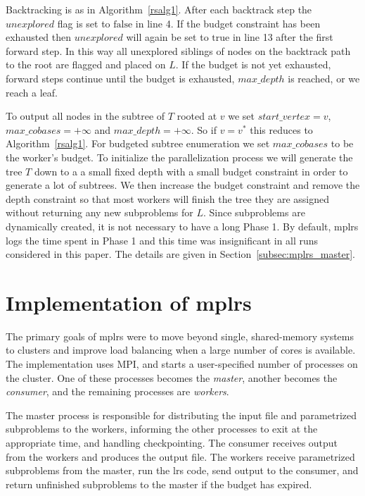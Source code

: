 \documentclass[a4paper,11pt]{article}   \usepackage{authblk} \usepackage[top=1.9cm,bottom=1.9cm,left=1.9cm,right=1.9cm]{geometry}
\newcommand{\progname}{\textsf}
\newcommand{\lrs}{\progname{lrs}\xspace}
\newcommand{\mplrs}{\progname{mplrs}\xspace}
\newcommand{\mymaxdepth}{\ensuremath{\mathit{max\_depth}}\xspace}
\newcommand{\maxcobases}{\ensuremath{\mathit{max\_cobases}}\xspace}
\newcommand{\startvertex}{\ensuremath{\mathit{start\_vertex}}\xspace}
\newcommand{\unexplored}{\ensuremath{\mathit{unexplored}}\xspace}
\newcommand{\myfalse}{\ensuremath{\textrm{false}}\xspace}
\newcommand{\mytrue}{\ensuremath{\textrm{true}}\xspace}
\begin{document}
Backtracking is as in Algorithm~\ref{rsalg1}.
After each backtrack step the \unexplored flag is set to \myfalse in line 4.
If the budget constraint has been exhausted then \unexplored will again be set
to \mytrue in line 13 after the first forward step.
In this way all unexplored siblings of nodes on the backtrack path to the root are flagged
and placed on $L$. If the budget is not yet exhausted, forward steps continue until the budget is exhausted, \mymaxdepth is reached, or we reach a leaf.

To output all nodes in the subtree of $T$ rooted at $v$ we set  
$\startvertex=v$, $\maxcobases=+\infty$ and $\mymaxdepth=+\infty$.
So if $v=v^*$ this reduces to Algorithm~\ref{rsalg1}.
For budgeted subtree enumeration we set \maxcobases to be the worker's budget.
To initialize the parallelization process we will generate the tree $T$ down to a 
a small fixed depth with a small budget constraint in order to generate a
lot of subtrees. We then increase the budget constraint 
and remove the depth constraint so that most workers will finish the tree they
are assigned without returning any new subproblems for $L$.
Since subproblems are dynamically created, it is not necessary to have a long
Phase 1.  By default, \mplrs logs the time spent in Phase 1 and this time was
insignificant in all runs considered in this paper.
The details are given in Section~\ref{subsec:mplrs_master}.


\section{Implementation of \mplrs}
\label{sec:mplrs}

The primary goals of \mplrs were to move beyond single, shared-memory
systems to clusters and improve load balancing when a large number of cores is available.
The implementation uses MPI, and starts a user-specified number of
processes on the cluster.  One of these processes becomes the \emph{master},
another becomes the \emph{consumer}, and the remaining processes are
\emph{workers}.

The master process is responsible for distributing the input file and
parametrized subproblems to the workers, informing the other processes to exit
at the appropriate time, and handling checkpointing.  The consumer
receives output from the workers and produces the output file.  The workers
receive parametrized subproblems from the master, run the \lrs
code,  send output to the consumer, and return unfinished subproblems 
to the master if the budget has expired.
\end{document}
